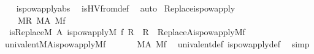 \begin{isabellebody}
%
\isadelimproof
\ \ %
\endisadelimproof
%
\isatagproof
{}\isamarkupfalse%
\ is{\isacharunderscore}{\kern0pt}powapply{\isacharunderscore}{\kern0pt}abs\ \isamarkupfalse%
\ is{\isacharunderscore}{\kern0pt}HVfrom{\isacharunderscore}{\kern0pt}def\ \isamarkupfalse%
\ auto%
\endisatagproof
{\isafoldproof}%
%
\isadelimproof
\isanewline
%
\endisadelimproof
\isanewline
{}\isamarkupfalse%
\ Replace{\isacharunderscore}{\kern0pt}is{\isacharunderscore}{\kern0pt}powapply{\isacharcolon}{\kern0pt}\isanewline
\ \ \isanewline
\ \ \ \ {\isachardoublequoteopen}M{\isacharparenleft}{\kern0pt}R{\isacharparenright}{\kern0pt}{\isachardoublequoteclose}\ {\isachardoublequoteopen}M{\isacharparenleft}{\kern0pt}A{\isacharparenright}{\kern0pt}{\isachardoublequoteclose}\ {\isachardoublequoteopen}M{\isacharparenleft}{\kern0pt}f{\isacharparenright}{\kern0pt}{\isachardoublequoteclose}\ \isanewline
\ \ \isanewline
\ \ {\isachardoublequoteopen}is{\isacharunderscore}{\kern0pt}Replace{\isacharparenleft}{\kern0pt}M{\isacharcomma}{\kern0pt}\ A{\isacharcomma}{\kern0pt}\ is{\isacharunderscore}{\kern0pt}powapply{\isacharparenleft}{\kern0pt}M{\isacharcomma}{\kern0pt}\ f{\isacharparenright}{\kern0pt}{\isacharcomma}{\kern0pt}\ R{\isacharparenright}{\kern0pt}\ {\isasymlongleftrightarrow}\ R\ {\isacharequal}{\kern0pt}\ Replace{\isacharparenleft}{\kern0pt}A{\isacharcomma}{\kern0pt}is{\isacharunderscore}{\kern0pt}powapply{\isacharparenleft}{\kern0pt}M{\isacharcomma}{\kern0pt}f{\isacharparenright}{\kern0pt}{\isacharparenright}{\kern0pt}{\isachardoublequoteclose}\isanewline
%
\isadelimproof
%
\endisadelimproof
%
\isatagproof
{}\isamarkupfalse%
\ {\isacharminus}{\kern0pt}\isanewline
\ \ \isamarkupfalse%
\ {\isachardoublequoteopen}univalent{\isacharparenleft}{\kern0pt}M{\isacharcomma}{\kern0pt}A{\isacharcomma}{\kern0pt}is{\isacharunderscore}{\kern0pt}powapply{\isacharparenleft}{\kern0pt}M{\isacharcomma}{\kern0pt}f{\isacharparenright}{\kern0pt}{\isacharparenright}{\kern0pt}{\isachardoublequoteclose}\ \isanewline
\ \ \ \ \isamarkupfalse%
\ {\isacartoucheopen}M{\isacharparenleft}{\kern0pt}A{\isacharparenright}{\kern0pt}{\isacartoucheclose}\ {\isacartoucheopen}M{\isacharparenleft}{\kern0pt}f{\isacharparenright}{\kern0pt}{\isacartoucheclose}\ \isamarkupfalse%
\ univalent{\isacharunderscore}{\kern0pt}def\ is{\isacharunderscore}{\kern0pt}powapply{\isacharunderscore}{\kern0pt}def\ \isamarkupfalse%
\ simp\isanewline
\ \ \isamarkupfalse%

\end{isabellebody}
